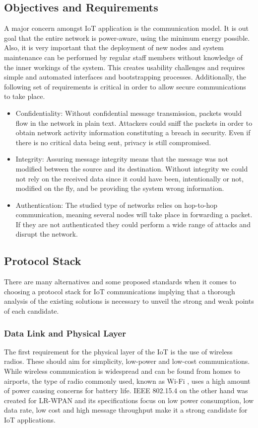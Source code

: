 \documentclass{sig-alternate-05-2015}
\begin{document}
\subsection{Objectives and Requirements}
A major concern amongst \gls{IoT} application is the communication model. It is out goal that the entire network is power-aware, using the minimum energy possible. Also, it is very important that the deployment of new nodes and system maintenance can be performed by regular staff members without knowledge of the inner workings of the system. This creates usability challenges and requires simple and automated interfaces and bootstrapping processes. Additionally, the following set of requirements is critical in order to allow secure communications to take place.
\begin{itemize}
	\item Confidentiality: Without confidential message transmission, packets would flow in the network in plain text. Attackers could sniff the packets in order to obtain network activity information constituting a breach in security. Even if there is no critical data being sent, privacy is still compromised.
	\item Integrity: Assuring message integrity means that the message was not modified between the source and its destination. Without integrity we could not rely on the received data since it could have been, intentionally or not, modified on the fly, and be providing the system wrong information.
	\item Authentication: The studied type of networks relies on hop-to-hop communication, meaning several nodes will take place in forwarding a packet. If they are not authenticated they could perform a wide range of attacks and disrupt the network.
\end{itemize}

\subsection{Protocol Stack}
\label{sec:protocol_stack}
There are many alternatives and some proposed standards when it comes to choosing a protocol stack for \gls{IoT} communications \cite{Al-Fuqaha2015} implying that a thorough analysis of the existing solutions is necessary to unveil the strong and weak points of each candidate.   

\subsubsection{Data Link and Physical Layer}
\label{sec:data_link}
The first requirement for the physical layer of the \gls{IoT} is the use of wireless radios. These should aim for simplicity, low-power and low-cost communications. While wireless communication is widespread and can be found from homes to airports, the type of radio commonly used, known as Wi-Fi \cite{IEEE2012}, uses a high amount of power causing concerns for battery life. IEEE 802.15.4 \cite{IEEEComputerSociety2011} on the other hand was created for \gls{LR-WPAN} and its specifications focus on low power consumption, low data rate, low cost and high message throughput make it a strong candidate for \gls{IoT} applications.
\end{document}
